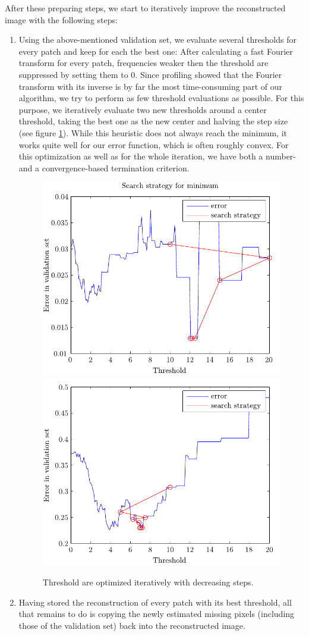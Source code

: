 \documentclass[10pt,conference,compsocconf]{IEEEtran}
\begin{document}
After these preparing steps, we start to iteratively improve the reconstructed image with the following steps:
\begin{enumerate}
\item Using the above-mentioned validation set, we evaluate several thresholds for every patch and keep for each the best one: After calculating a fast Fourier transform for every patch, frequencies weaker then the threshold are suppressed by setting them to 0. Since profiling showed that the Fourier transform with its inverse is by far the most time-consuming part of our algorithm, we try to perform as few threshold evaluations as possible. For this purpose, we iteratively evaluate two new thresholds around a center threshold, taking the best one as the new center and halving the step size (see figure \ref{threshold_optimization}). While this heuristic does not always reach the minimum, it works quite well for our error function, which is often roughly convex. For this optimization as well as for the whole iteration, we have both a number- and a convergence-based termination criterion.

\begin{figure}
\centering
\includegraphics[width=0.7\columnwidth]{../plots/search_strategy_6.pdf}
\includegraphics[width=0.7\columnwidth]{../plots/search_strategy_2.pdf}
\caption{Threshold are optimized iteratively with decreasing steps.}
\label{threshold_optimization}
\end{figure}

\item Having stored the reconstruction of every patch with its best threshold, all that remains to do is copying the newly estimated missing pixels (including those of the validation set) back into the reconstructed image.
\end{enumerate}
\end{document}
